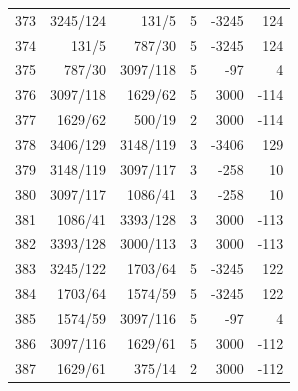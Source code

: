 \documentclass[11pt,a4paper]{article}
\begin{document}
\begin{minipage}[t]{.49\linewidth}
\begin{tabular*}{\linewidth}{@{}r@{\extracolsep{\fill}}rrrrr@{}}
373 & 3245/124 & 131/5 & 5 & -3245 & 124\\
374 & 131/5 & 787/30 & 5 & -3245 & 124\\
375 & 787/30 & 3097/118 & 5 & -97 & 4\\
376 & 3097/118 & 1629/62 & 5 & 3000 & -114\\
377 & 1629/62 & 500/19 & 2 & 3000 & -114\\
378 & 3406/129 & 3148/119 & 3 & -3406 & 129\\
379 & 3148/119 & 3097/117 & 3 & -258 & 10\\
380 & 3097/117 & 1086/41 & 3 & -258 & 10\\
381 & 1086/41 & 3393/128 & 3 & 3000 & -113\\
382 & 3393/128 & 3000/113 & 3 & 3000 & -113\\
383 & 3245/122 & 1703/64 & 5 & -3245 & 122\\
384 & 1703/64 & 1574/59 & 5 & -3245 & 122\\
385 & 1574/59 & 3097/116 & 5 & -97 & 4\\
386 & 3097/116 & 1629/61 & 5 & 3000 & -112\\
387 & 1629/61 & 375/14 & 2 & 3000 & -112\\
\bottomrule\end{tabular*}\end{minipage}\hfill
\end{document}
